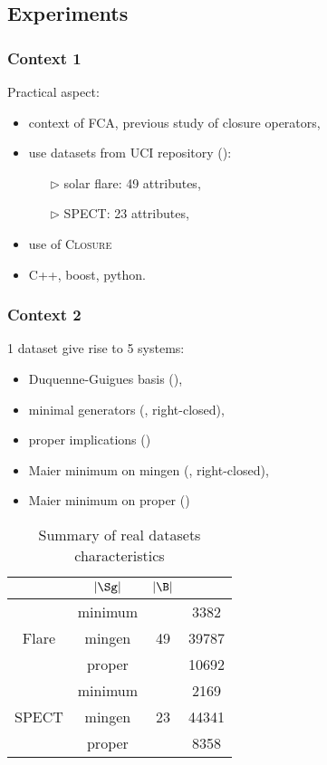 
\subsection{Experiments}

\begin{frame}
\frametitle{Context 1}

Practical aspect:
\begin{itemize}
	\item context of FCA, previous study of closure operators,	
	\item use datasets from UCI repository ():
		\begin{itemize}
			\item[\color{belize} $\triangleright$] solar flare: 49 attributes,
			\item[\color{belize} $\triangleright$] SPECT: 23 attributes,
			
		\end{itemize}
	\item use of \textsc{Closure} 
	\item C++, boost, python.
	
\end{itemize}

\end{frame}

\begin{frame}[fragile]
\frametitle{Context 2}

1 dataset give rise to 5 systems:
\begin{itemize}
	\item Duquenne-Guigues basis (),
	\item minimal generators (, right-closed),
	\item proper implications ()
	\item Maier minimum on mingen (, right-closed),
	\item Maier minimum on proper ()
\end{itemize}

\begin{table}[ht]
	\centering
	\scriptsize
	\begin{tabular}{| c | c | c | c |}
		\hline \rowcolor{clouds}
		\multicolumn{2}{|c|}{$\I$} & $|\Sg|$ & $|\B|$ \\ \hline
		
		\multirow{3}{*}{Flare} & minimum & \multirow{3}{*}{49} & 3382 \\
		& mingen & & 39787 \\
		& proper & & 10692 \\ \hline
		
		\multirow{3}{*}{SPECT} & minimum & \multirow{3}{*}{23} & 2169 \\
		& mingen & & 44341 \\
		& proper & & 8358 \\ \hline

	\end{tabular}
	\caption{Summary of real datasets characteristics}
	\label{tab:real-DS}
\end{table}

\end{frame}

